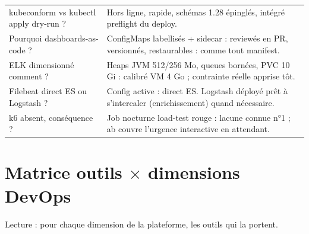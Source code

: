 \documentclass[12pt,a4paper,twoside,openright]{report}
\begin{document}
\begin{longtable}{@{}p{6.2cm}p{8.0cm}@{}}
kubeconform vs kubectl apply dry-run ? & Hors ligne, rapide, schémas 1.28 épinglés, intégré preflight du deploy. \\
Pourquoi dashboards-as-code ? & ConfigMaps labellisés + sidecar : reviewés en PR, versionnés, restaurables : comme tout manifest. \\
ELK dimensionné comment ? & Heaps JVM 512/256 Mo, queues bornées, PVC 10 Gi : calibré VM 4 Go ; contrainte réelle apprise tôt. \\
Filebeat direct ES ou Logstash ? & Config active : direct ES. Logstash déployé prêt à s'intercaler (enrichissement) quand nécessaire. \\
k6 absent, conséquence ? & Job nocturne load-test rouge : lacune connue n°1 ; ab couvre l'urgence interactive en attendant. \\
\bottomrule
\end{longtable}

\chapter{Matrice outils $\times$ dimensions DevOps}

Lecture : pour chaque dimension de la plateforme, les outils qui la portent.
\end{document}
